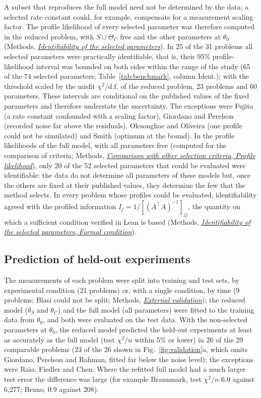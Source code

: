 \documentclass[pdflatex,sn-nature]{sn-jnl}
\theoremstyle{plain}
\newcommand{\mref}[2]{\hyperref[#1]{#2}}
\begin{document}
A subset that reproduces the full model need not be determined by the data; a selected rate constant could, for example, compensate for a measurement scaling factor. The profile likelihood of every selected parameter was therefore computed in the reduced problem, with $S\cup\Theta_C$ free and the other parameters at $\theta_0$ (Methods, \mref{met:identif}{\emph{Identifiability of the selected parameters}}). In 25 of the 31 problems all selected parameters were practically identifiable, that is, their 95\% profile-likelihood interval was bounded on both sides within the range of the study (65 of the 74 selected parameters; Table~\ref{tab:benchmark}, column Ident.); with the threshold scaled by the misfit $\chi^2/\mathrm{d.f.}$ of the reduced problem, 23 problems and 60 parameters. These intervals are conditional on the published values of the fixed parameters and therefore understate the uncertainty. The exceptions were Fujita (a rate constant confounded with a scaling factor), Giordano and Perelson (recorded noise far above the residuals), Okuonghae and Oliveira (one profile could not be simulated) and Smith (optimum at the bound). In the profile likelihoods of the full model, with all parameters free (computed for the comparison of criteria; Methods, \mref{met:comp-pl}{\emph{Comparison with other selection criteria}, \emph{Profile likelihood}}), only 20 of the 52 selected parameters that could be evaluated were identifiable: the data do not determine all parameters of these models but, once the others are fixed at their published values, they determine the few that the method selects. In every problem whose profiles could be evaluated, identifiability agreed with the profiled information $I_j=1/[(A^{\top}A)^{-1}]_{jj}$, the quantity on which a sufficient condition verified in Lean is based (Methods, \mref{met:identif-theorem}{\emph{Identifiability of the selected parameters}, \emph{Formal condition}}).

\subsection*{Prediction of held-out experiments}\label{sec:validation}

The measurements of each problem were split into training and test sets, by experimental condition (21 problems) or, with a single condition, by time (9 problems; Blasi could not be split; Methods, \mref{met:validation}{\emph{External validation}}); the reduced model ($\theta_S$ and $\theta_C$) and the full model (all parameters) were fitted to the training data from $\theta_0$, and both were evaluated on the test data. With the non-selected parameters at $\theta_0$, the reduced model predicted the held-out experiments at least as accurately as the full model (test $\chi^2/n$ within 5\% or lower) in 26 of the 29 comparable problems (23 of the 26 shown in Fig.~\ref{fig:validation}a, which omits Giordano, Perelson and Rahman, fitted far below the noise level); the exceptions were Raia, Fiedler and Chen. Where the refitted full model had a much larger test error the difference was large (for example Brannmark, test $\chi^2/n$ 6.0 against 6,277; Bruno, 0.9 against 208).
\end{document}
